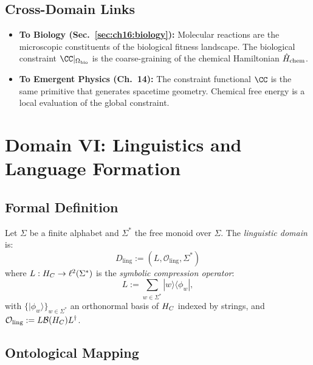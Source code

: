 \subsection{Cross-Domain Links}

\begin{itemize}
  \item \textbf{To Biology (Sec.~\ref{sec:ch16:biology}):}
        Molecular reactions are the microscopic constituents of the
        biological fitness landscape.  The biological constraint
        $\CC|_{\Omega_{\mathrm{bio}}}$ is the coarse-graining of
        the chemical Hamiltonian $\hat{H}_{\mathrm{chem}}$.
  \item \textbf{To Emergent Physics (Ch.~14):} The constraint
        functional $\CC$ is the same primitive that generates
        spacetime geometry.  Chemical free energy is a local evaluation
        of the global constraint.
\end{itemize}

\section{Domain VI: Linguistics and Language Formation}
\label{sec:ch17:linguistics}

\subsection{Formal Definition}

\begin{definition}\label{def:17.3}
Let $\Sigma$ be a finite alphabet and $\Sigma^*$ the free monoid over
$\Sigma$.  The \emph{linguistic domain} is:
\[
  D_{\mathrm{ling}} := (L, \mathcal{O}_{\mathrm{ling}}, \Sigma^*)
\]
where $L : H_C \to \ell^2(\Sigma^*)$ is the \emph{symbolic compression
operator}:
\[
  L := \sum_{w \in \Sigma^*} |w\rangle \langle \phi_w |,
\]
with $\{|\phi_w\rangle\}_{w \in \Sigma^*}$ an orthonormal basis of
$H_C$ indexed by strings, and $\mathcal{O}_{\mathrm{ling}} :=
L \mathcal{B}(H_C) L^\dagger$.
\end{definition}

\subsection{Ontological Mapping}

